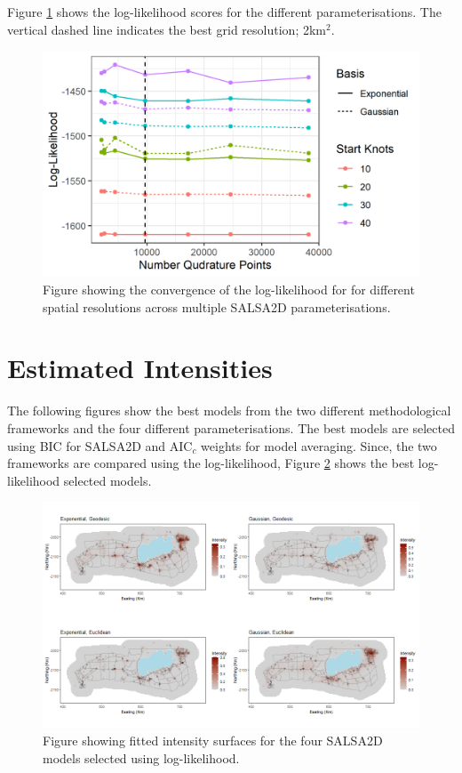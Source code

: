 Figure \ref{fig:resolutionconvergence} shows the log-likelihood scores for the different parameterisations. The vertical dashed line indicates the best grid resolution; 2km$^2$.

\begin{figure}[!htb]
\centering
\includegraphics[width=0.9\linewidth]{suppimages/ppconverge.png}
\caption{Figure showing the convergence of the log-likelihood for for different spatial resolutions across multiple SALSA2D parameterisations.}
\label{fig:resolutionconvergence}
\end{figure}

\section{Estimated Intensities}

The following figures show the best models from the two different methodological frameworks and the four different parameterisations. The best models are selected using BIC for SALSA2D and AIC$_c$ weights for model averaging. Since, the two frameworks are compared using the log-likelihood, Figure \ref{fig:salsaloglik} shows the best log-likelihood selected models. 


\begin{figure}[!htb]
\centering
\includegraphics[width=0.9\linewidth]{suppimages/mrseapredplots_4methods.png}
\caption{Figure showing fitted intensity surfaces for the four SALSA2D models selected using log-likelihood.}
\label{fig:salsaloglik}
\end{figure}

